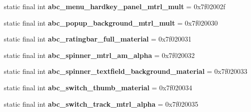 \begin{DoxyCompactItemize}
\item 
\hypertarget{classandroid_1_1support_1_1v7_1_1appcompat_1_1_r_1_1drawable_aa677c8f22035c007340b8881b60fe2e6}{}static final int {\bfseries abc\+\_\+menu\+\_\+hardkey\+\_\+panel\+\_\+mtrl\+\_\+mult} = 0x7f02002f\label{classandroid_1_1support_1_1v7_1_1appcompat_1_1_r_1_1drawable_aa677c8f22035c007340b8881b60fe2e6}

\item 
\hypertarget{classandroid_1_1support_1_1v7_1_1appcompat_1_1_r_1_1drawable_a4b5e2894745ea21d9b5a6b2bbce32b54}{}static final int {\bfseries abc\+\_\+popup\+\_\+background\+\_\+mtrl\+\_\+mult} = 0x7f020030\label{classandroid_1_1support_1_1v7_1_1appcompat_1_1_r_1_1drawable_a4b5e2894745ea21d9b5a6b2bbce32b54}

\item 
\hypertarget{classandroid_1_1support_1_1v7_1_1appcompat_1_1_r_1_1drawable_a7604ea46b8ab36b9392a1cfce4d47e99}{}static final int {\bfseries abc\+\_\+ratingbar\+\_\+full\+\_\+material} = 0x7f020031\label{classandroid_1_1support_1_1v7_1_1appcompat_1_1_r_1_1drawable_a7604ea46b8ab36b9392a1cfce4d47e99}

\item 
\hypertarget{classandroid_1_1support_1_1v7_1_1appcompat_1_1_r_1_1drawable_a62de668e8275bb98dd05bc9d19b26513}{}static final int {\bfseries abc\+\_\+spinner\+\_\+mtrl\+\_\+am\+\_\+alpha} = 0x7f020032\label{classandroid_1_1support_1_1v7_1_1appcompat_1_1_r_1_1drawable_a62de668e8275bb98dd05bc9d19b26513}

\item 
\hypertarget{classandroid_1_1support_1_1v7_1_1appcompat_1_1_r_1_1drawable_a17391731f957db32d3e1562fda39e645}{}static final int {\bfseries abc\+\_\+spinner\+\_\+textfield\+\_\+background\+\_\+material} = 0x7f020033\label{classandroid_1_1support_1_1v7_1_1appcompat_1_1_r_1_1drawable_a17391731f957db32d3e1562fda39e645}

\item 
\hypertarget{classandroid_1_1support_1_1v7_1_1appcompat_1_1_r_1_1drawable_ad7dddd1f9a02c34bd3854ab853bef876}{}static final int {\bfseries abc\+\_\+switch\+\_\+thumb\+\_\+material} = 0x7f020034\label{classandroid_1_1support_1_1v7_1_1appcompat_1_1_r_1_1drawable_ad7dddd1f9a02c34bd3854ab853bef876}

\item 
\hypertarget{classandroid_1_1support_1_1v7_1_1appcompat_1_1_r_1_1drawable_a4922c776516a33df969754eeee3a767f}{}static final int {\bfseries abc\+\_\+switch\+\_\+track\+\_\+mtrl\+\_\+alpha} = 0x7f020035\label{classandroid_1_1support_1_1v7_1_1appcompat_1_1_r_1_1drawable_a4922c776516a33df969754eeee3a767f}


\end{DoxyCompactItemize}
